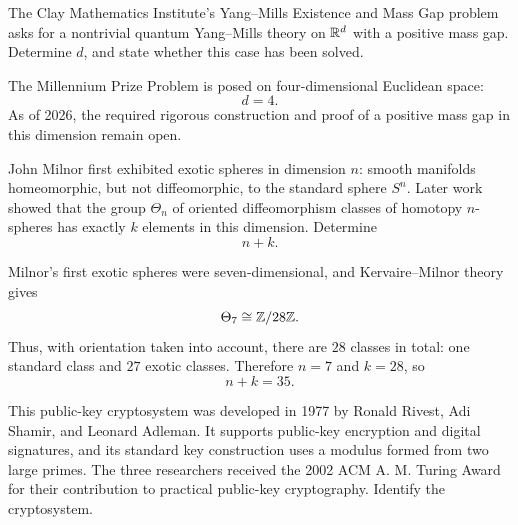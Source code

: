 
    \begin{expectedproblem}
        The Clay Mathematics Institute's Yang--Mills Existence and Mass Gap
        problem asks for a nontrivial quantum Yang--Mills theory on
        $\mathbb{R}^d$ with a positive mass gap. Determine $d$, and state whether this
        case has been solved.
    \end{expectedproblem}

    \begin{solution}
        The Millennium Prize Problem is posed on four-dimensional Euclidean
        space:
        \[
            \boxed{d=4}.
        \]
        As of 2026, the required rigorous construction and proof of a positive
        mass gap in this dimension remain open.
    \end{solution}

    \begin{expectedproblem}
        John Milnor first exhibited exotic spheres in dimension $n$: smooth
        manifolds homeomorphic, but not diffeomorphic, to the standard sphere
        $S^n$. Later work showed that the group $\Theta_n$ of oriented
        diffeomorphism classes of homotopy $n$-spheres has exactly $k$
        elements in this dimension. Determine
        \[
            n+k.
        \]
    \end{expectedproblem}

    \begin{solution}
        Milnor's first exotic spheres were seven-dimensional, and
        Kervaire--Milnor theory gives
        \[
            \Theta_7\cong\mathbb{Z}/28\mathbb{Z}.
        \]
        Thus, with orientation taken into account, there are $28$ classes in
        total: one standard class and $27$ exotic classes. Therefore $n=7$
        and $k=28$, so
        \[
            \boxed{n+k=35}.
        \]
    \end{solution}

    \begin{expectedproblem}
        This public-key cryptosystem was developed in 1977 by Ronald Rivest,
        Adi Shamir, and Leonard Adleman. It supports public-key encryption and
        digital signatures, and its standard key construction uses a modulus
        formed from two large primes. The three researchers received the 2002
        ACM A. M. Turing Award for their contribution to practical public-key
        cryptography. Identify the cryptosystem.
    \end{expectedproblem}

